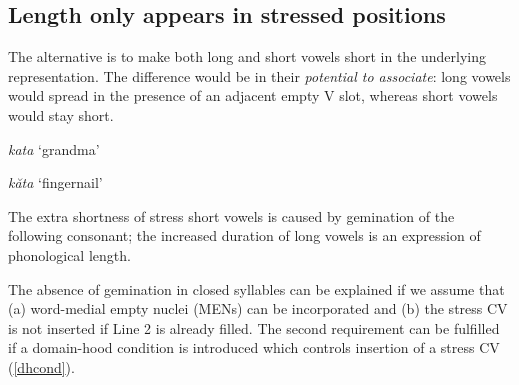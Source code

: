 \documentclass[a4paper, 12pt]{article}
\begin{document}
			\subsection{Length only appears in stressed positions}
			
	The alternative is to make both long and short vowels short in the underlying representation. The difference would be in their \emph{potential to associate}: long vowels would spread in the presence of an adjacent empty V slot, whereas short vowels would stay short.
	
		\begin{minipage}{0.4\linewidth}
			\ex \emph{kata} `grandma' \\
			\xe
		\end{minipage}
		\hfill
		\begin{minipage}{0.5\linewidth}
			\ex \emph{kăta} `fingernail' \\
			\xe
		\end{minipage}
		
	\noindent The extra shortness of stress short vowels is caused by gemination of the following consonant; the increased duration of long vowels is an expression of phonological length.
	
	The absence of gemination in closed syllables can be explained if we assume that (a) word-medial empty nuclei (MENs) can be incorporated and (b) the stress CV is not inserted if Line 2 is already filled. The second requirement can be fulfilled if a domain-hood condition is introduced which controls insertion of a stress CV (\ref{dhcond}). 
	
\end{document}
